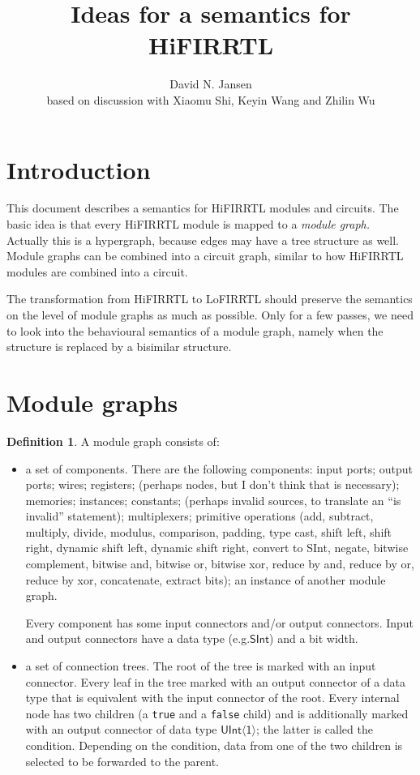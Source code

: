 \documentclass{article}
\title{Ideas for a semantics for HiFIRRTL}
\author{David N. Jansen \\[0.3ex] based on discussion with Xiaomu Shi, Keyin Wang and Zhilin Wu}
\theoremstyle{definition}
\newtheorem{definition}{Definition}
\begin{document}
\maketitle

\section{Introduction}

This document describes a semantics for HiFIRRTL modules and circuits.
The basic idea is that every HiFIRRTL module is mapped to a \emph{module graph.}
Actually this is a hypergraph, because edges may have a tree structure as well.
Module graphs can be combined into a circuit graph,
similar to how HiFIRRTL modules are combined into a circuit.

The transformation from HiFIRRTL to LoFIRRTL should preserve the semantics on the level of module graphs
as much as possible.
Only for a few passes, we need to look into the behavioural semantics of a module graph,
namely when the structure is replaced by a bisimilar structure.

\section{Module graphs}

\begin{definition}
A module graph consists of:
\begin{itemize}
\item	a set of components.
	There are the following components:
	input ports;
	output ports;
	wires;
	registers;
	(perhaps nodes, but I don't think that is necessary);
	memories;
	instances;
	constants;
	(perhaps invalid sources, to translate an ``is invalid'' statement);
	multiplexers;
	primitive operations (add, subtract, multiply, divide, modulus, comparison, padding,
		type cast, shift left, shift right, dynamic shift left, dynamic shift right,
		convert to SInt, negate, bitwise complement, bitwise and, bitwise or, bitwise xor,
		reduce by and, reduce by or, reduce by xor, concatenate, extract bits);
	an instance of another module graph.

	Every component has some input connectors and/or output connectors.
	Input and output connectors have a data type (e.g.\@ $\mathsf{SInt}$) and a bit width.
\item	a set of connection trees.
	The root of the tree is marked with an input connector.
	Every leaf in the tree marked with an output connector of a data type that is equivalent with the input connector of the root.
	Every internal node has two children (a \texttt{true} and a \texttt{false} child)
	and is additionally marked with an output connector of data type $\mathsf{UInt\langle 1\rangle}$;
	the latter is called the condition.
	Depending on the condition, data from one of the two children is selected to be forwarded to the parent.
\end{itemize}
\end{definition}
\end{document}

